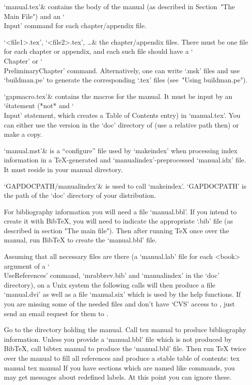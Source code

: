 \beginitems
`manual.tex'&
    contains the body of the manual
    (as described in Section~"The Main File")
    and an `\\Input' command for each chapter/appendix file.

`<file1>.tex', `<file2>.tex', \dots &
    the chapter/appendix files. There must be one file for each chapter
    or appendix, and each such file should have a `\\Chapter' or
    `\\PreliminaryChapter' command. Alternatively, one can write
    `.msk' files and use `buildman.pe' to generate the corresponding
    `.tex' files (see~"Using buildman.pe").

`gapmacro.tex'&
    contains the macros for the manual.
    It must be input by an `\' statement (*not* and `\\Input'
    statement, which creates a Table of Contents entry) in `manual.tex'.
    You can either use the version in the `doc' directory of {\GAP}
    (use a relative path then) or make a copy.

`manual.mst'&
    is a ``configure'' file used by `makeindex' when processing
    index information in a {\TeX}-generated and `manualindex'-preprocessed
    `manual.idx' file.
    It must reside in your manual directory.

`GAPDOCPATH/manualindex'&
    is used to call `makeindex'.
    `GAPDOCPATH' is the path of the `doc' directory of your {\GAP}
    distribution.
\enditems

For bibliography information you will need a file `manual.bbl'. If you
intend to create it with Bib{\TeX}, you will need to indicate the
appropriate `.bib' file (as described in section "The main file"). Then
after running {\TeX} once over the manual, run Bib{\TeX} to create the
`manual.bbl' file.

Assuming that all necessary files are there (a `manual.lab' file for each
<book> argument of a `\\UseReferences' command, `mrabbrev.bib' and
`manualindex' in the {\GAP} `doc' directory),
on a Unix system the following calls will then produce a file `manual.dvi'
as well as a file `manual.six' which is used by the {\GAP} help functions.
If you are missing some of the needed files and don't have `CVS' access to
{\GAP}, just send an email request for them to 
.

Go to the directory holding the manual. Call
\begintt
tex manual
\endtt
to produce bibliography information. Unless you provide a `manual.bbl' file
which is not produced by Bib{\TeX}, call
\begintt
bibtex manual
\endtt
to produce the `manual.bbl' file. Then run {\TeX} twice over the manual to
fill all references and produce a stable table of contents:
\begintt
tex manual
tex manual
\endtt
If you have sections which are named like commands, you may get messages
about redefined labels. At this point you can ignore these.

